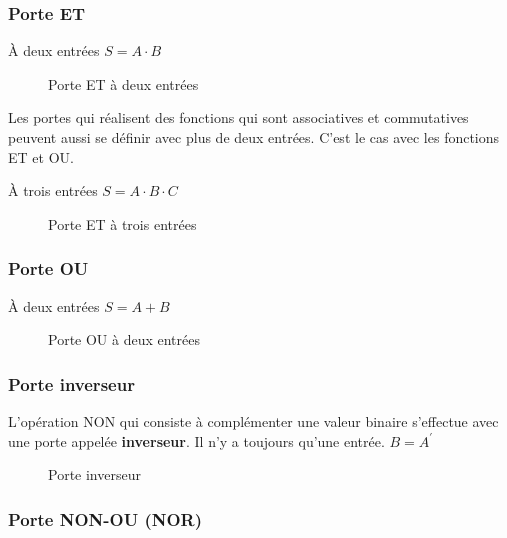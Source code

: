 \documentclass[11pt]{article}
\begin{document}
\subsubsection{Porte ET}
\label{sec:org0bdd555}

À deux entrées \(S =  A \cdot B\)

\begin{figure}[htbp]
\centering

\caption{\label{fig:org6c2b0eb}Porte ET à deux entrées}
\end{figure}

Les portes qui réalisent des fonctions qui sont associatives et
commutatives peuvent aussi se définir avec plus de deux entrées. C'est
le cas avec les fonctions ET et OU.

À trois entrées \(S =  A \cdot B \cdot C\)

\begin{figure}[htbp]
\centering

\caption{\label{fig:orgbf2a25a}Porte ET à trois entrées}
\end{figure}

\subsubsection{Porte OU}
\label{sec:orge5204b5}

À deux entrées \(S =  A + B\)

\begin{figure}[htbp]
\centering

\caption{\label{fig:org8cfeb1c}Porte OU à deux entrées}
\end{figure}

\subsubsection{Porte inverseur}
\label{sec:org001cb0a}

L'opération NON qui consiste à complémenter une valeur binaire
s'effectue avec une porte appelée \textbf{inverseur}.  Il n'y a toujours
qu'une entrée. \(B = A^\prime\)

\begin{figure}[htbp]
\centering

\caption{\label{fig:org9adc1f4}Porte inverseur}
\end{figure} 

\subsubsection{Porte NON-OU (NOR)}
\label{sec:orgdb4dffb}
\end{document}
